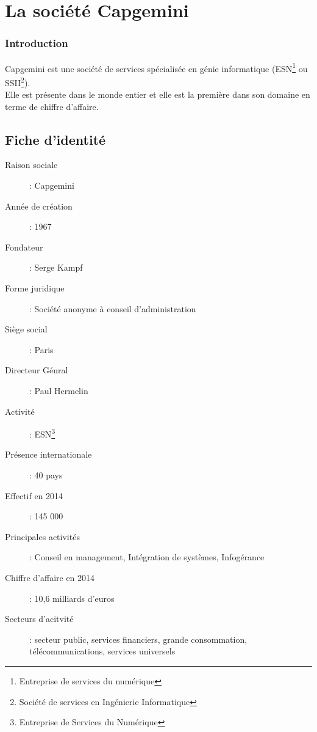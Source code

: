 \chapter{La société Capgemini}
\subsection*{Introduction}
Capgemini est une société de services spécialisée en génie informatique (ESN\footnote{Entreprise de services du numérique} ou SSII\footnote{Société de services en Ingénierie Informatique}).
\\Elle est présente dans le monde entier et elle est la première dans son domaine en terme de chiffre d'affaire.
\newpage
\section{Fiche d'identité}
\begin{description}
  \item[Raison sociale] : Capgemini
  \item[Année de création] : 1967
  \item[Fondateur] : Serge Kampf
  \item[Forme juridique] : Société anonyme à conseil d'administration
  \item[Siège social] : Paris
  \item[Directeur Génral] : Paul Hermelin
  \item[Activité] : ESN\footnote{Entreprise de Services du Numérique}
  \item[Présence internationale] : 40 pays
  \item[Effectif en 2014] : 145 000
  \item[Principales activités] : Conseil en management, Intégration de systèmes, Infogérance
  \item[Chiffre d'affaire en 2014] : 10,6 milliards d'euros
  \item[Secteurs d'acitvité] : secteur public, services financiers, grande consommation, télécommunications, services universels
\end{description}
\begin{figure}[h]
\end{figure}


